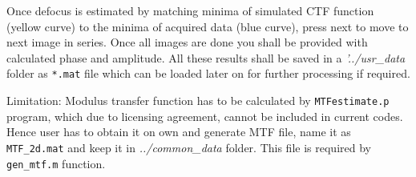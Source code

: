Once defocus is estimated by matching minima of simulated CTF function (yellow curve) to the minima of acquired data (blue curve), press next to move to next image in series.
Once all images are done you shall be provided with calculated phase and amplitude.
All these results shall be saved in a \textit{'../usr\_data} folder as \texttt{*.mat} file which can be loaded later on for further processing if required.

Limitation: Modulus transfer function has to be calculated by \texttt{MTFestimate.p} program, which due to licensing agreement, cannot be included in current codes.\cite{VandenBroek2012}
Hence user has to obtain it on own and generate MTF file, name it as \texttt{MTF\_2d.mat} and keep it in \textit{../common\_data} folder.
This file is required by \texttt{gen\_mtf.m} function.
